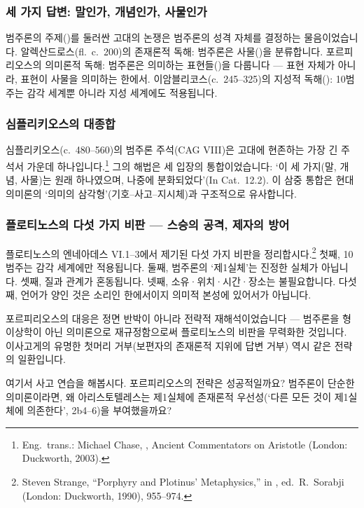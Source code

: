 \documentclass[12pt, a4paper]{article}
\begin{document}
\subsubsection{세 가지 답변: 말인가, 개념인가, 사물인가}

범주론의 주제()를 둘러싼 고대의 논쟁은 범주론의 성격 자체를 결정하는 물음이었습니다. 알렉산드로스(fl.\ c.\ 200)의 존재론적 독해: 범주론은 사물()을 분류합니다. 포르피리오스의 의미론적 독해: 범주론은 의미하는 표현들()을 다룹니다 --- 표현 자체가 아니라, 표현이 사물을 의미하는 한에서. 이암블리코스(c.\ 245--325)의 지성적 독해(): 10범주는 감각 세계뿐 아니라 지성 세계에도 적용됩니다.

\subsubsection{심플리키오스의 대종합}

심플리키오스(c.\ 480--560)의 범주론 주석(CAG VIII)은 고대에 현존하는 가장 긴 주석서 가운데 하나입니다.\footnote{Eng.\ trans.: Michael Chase, , Ancient Commentators on Aristotle (London: Duckworth, 2003).} 그의 해법은 세 입장의 통합이었습니다: `이 세 가지(말, 개념, 사물)는 원래 하나였으며, 나중에 분화되었다'(In Cat.\ 12.2). 이 삼중 통합은 현대 의미론의 `의미의 삼각형'(기호--사고--지시체)과 구조적으로 유사합니다.

\subsubsection{플로티노스의 다섯 가지 비판 --- 스승의 공격, 제자의 방어}

플로티노스의 엔네아데스 VI.1--3에서 제기된 다섯 가지 비판을 정리합시다.\footnote{Steven Strange, ``Porphyry and Plotinus' Metaphysics,'' in , ed.\ R.\ Sorabji (London: Duckworth, 1990), 955--974.} 첫째, 10범주는 감각 세계에만 적용됩니다. 둘째, 범주론의 `제1실체'는 진정한 실체가 아닙니다. 셋째, 질과 관계가 혼동됩니다. 넷째, 소유·위치·시간·장소는 불필요합니다. 다섯째, 언어가 양인 것은 소리인 한에서이지 의미적 본성에 있어서가 아닙니다.

포르피리오스의 대응은 정면 반박이 아니라 전략적 재해석이었습니다 --- 범주론을 형이상학이 아닌 의미론으로 재규정함으로써 플로티노스의 비판을 무력화한 것입니다. 이사고게의 유명한 첫머리 거부(보편자의 존재론적 지위에 답변 거부) 역시 같은 전략의 일환입니다.

여기서 사고 연습을 해봅시다. 포르피리오스의 전략은 성공적일까요? 범주론이 단순한 의미론이라면, 왜 아리스토텔레스는 제1실체에 존재론적 우선성(`다른 모든 것이 제1실체에 의존한다', 2b4--6)을 부여했을까요?
\end{document}
